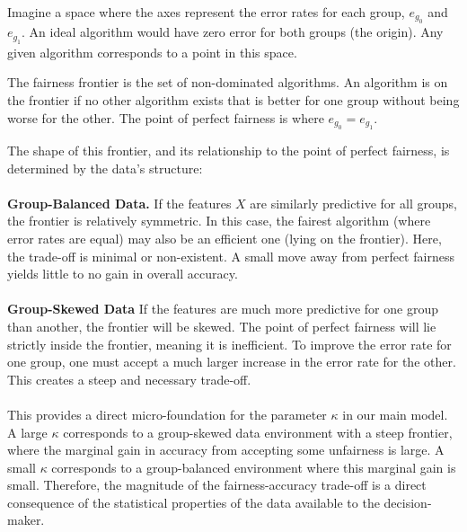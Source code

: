 Imagine a space where the axes represent the error rates for each group, $e_{g_0}$ and $e_{g_1}$. An ideal algorithm would have zero error for both groups (the origin). Any given algorithm corresponds to a point in this space.

\begin{definition}
The fairness frontier is the set of non-dominated algorithms. An algorithm is on the frontier if no other algorithm exists that is better for one group without being worse for the other. The point of perfect fairness is where $e_{g_0} = e_{g_1}$.
\end{definition}

The shape of this frontier, and its relationship to the point of perfect fairness, is determined by the data's structure:
\\ \\ \textbf{Group-Balanced Data.} If the features $X$ are similarly predictive for all groups, the frontier is relatively symmetric. In this case, the fairest algorithm (where error rates are equal) may also be an efficient one (lying on the frontier). Here, the trade-off is minimal or non-existent. A small move away from perfect fairness yields little to no gain in overall accuracy.
\\ \\ \textbf{Group-Skewed Data} If the features are much more predictive for one group than another, the frontier will be skewed. The point of perfect fairness will lie strictly inside the frontier, meaning it is inefficient. To improve the error rate for one group, one must accept a much larger increase in the error rate for the other. This creates a steep and necessary trade-off.
\\ \\
This provides a direct micro-foundation for the parameter $\kappa$ in our main model. A large $\kappa$ corresponds to a group-skewed data environment with a steep frontier, where the marginal gain in accuracy from accepting some unfairness is large. A small $\kappa$ corresponds to a group-balanced environment where this marginal gain is small. Therefore, the magnitude of the fairness-accuracy trade-off is a direct consequence of the statistical properties of the data available to the decision-maker.

